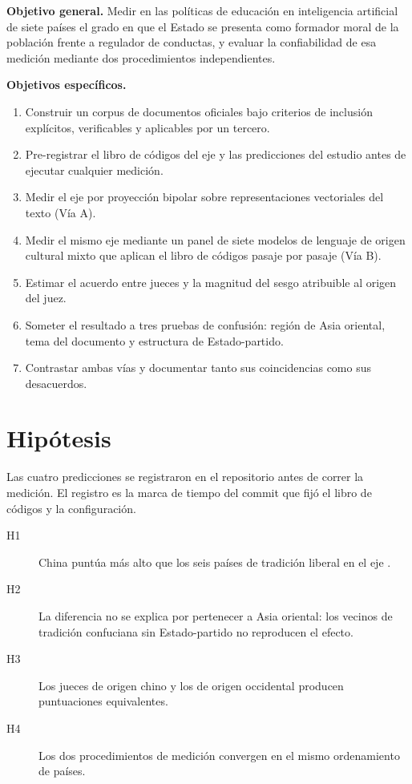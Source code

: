 \textbf{Objetivo general.} Medir en las políticas de educación en inteligencia artificial de siete países el grado en que el Estado se presenta como formador moral de la población frente a regulador de conductas, y evaluar la confiabilidad de esa medición mediante dos procedimientos independientes.

\textbf{Objetivos específicos.}

\begin{enumerate}
    \item Construir un corpus de documentos oficiales bajo criterios de inclusión explícitos, verificables y aplicables por un tercero.
    \item Pre-registrar el libro de códigos del eje \ejedf y las predicciones del estudio antes de ejecutar cualquier medición.
    \item Medir el eje por proyección bipolar sobre representaciones vectoriales del texto (Vía A).
    \item Medir el mismo eje mediante un panel de siete modelos de lenguaje de origen cultural mixto que aplican el libro de códigos pasaje por pasaje (Vía B).
    \item Estimar el acuerdo entre jueces y la magnitud del sesgo atribuible al origen del juez.
    \item Someter el resultado a tres pruebas de confusión: región de Asia oriental, tema del documento y estructura de Estado-partido.
    \item Contrastar ambas vías y documentar tanto sus coincidencias como sus desacuerdos.
\end{enumerate}


\section{Hipótesis}

Las cuatro predicciones se registraron en el repositorio antes de correr la medición. El registro es la marca de tiempo del commit que fijó el libro de códigos y la configuración.

\begin{description}
    \item[H1] China puntúa más alto que los seis países de tradición liberal en el eje \ejedf.
    \item[H2] La diferencia no se explica por pertenecer a Asia oriental: los vecinos de tradición confuciana sin Estado-partido no reproducen el efecto.
    \item[H3] Los jueces de origen chino y los de origen occidental producen puntuaciones equivalentes.
    \item[H4] Los dos procedimientos de medición convergen en el mismo ordenamiento de países.
\end{description}

